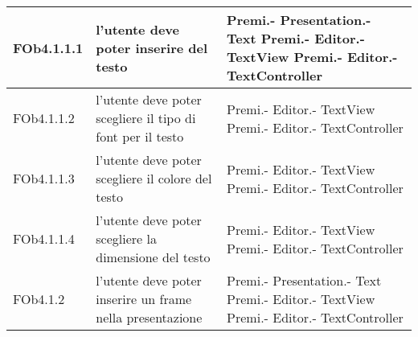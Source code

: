 \begin{longtable}{|l|p{5cm}|p{4cm}|}
\hline
FOb4.1.1.1 & l'utente deve poter inserire del testo & Premi.- \linebreak Presentation.- \linebreak Text \linebreak Premi.- \linebreak Editor.- \linebreak TextView \linebreak Premi.- \linebreak Editor.- \linebreak TextController \linebreak \\
\hline
FOb4.1.1.2 & l'utente deve poter scegliere il tipo di font per il testo & Premi.- \linebreak Editor.- \linebreak TextView \linebreak Premi.- \linebreak Editor.- \linebreak TextController \linebreak \\
\hline
FOb4.1.1.3 & l'utente deve poter scegliere il colore del testo & Premi.- \linebreak Editor.- \linebreak TextView \linebreak Premi.- \linebreak Editor.- \linebreak TextController \linebreak \\
\hline
FOb4.1.1.4 & l'utente deve poter scegliere la dimensione del testo & Premi.- \linebreak Editor.- \linebreak TextView \linebreak Premi.- \linebreak Editor.- \linebreak TextController \linebreak \\
\hline
FOb4.1.2 & l'utente deve poter inserire un frame nella presentazione & Premi.- \linebreak Presentation.- \linebreak Text \linebreak Premi.- \linebreak Editor.- \linebreak TextView \linebreak Premi.- \linebreak Editor.- \linebreak TextController \linebreak \\

\end{longtable}
